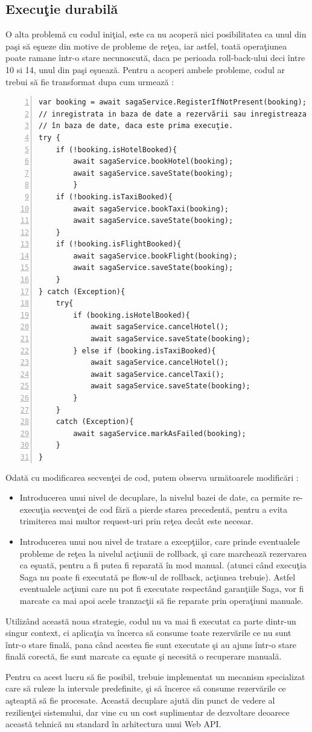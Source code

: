\documentclass[a4paper,12pt]{report}
\begin{document}
\subsection{Execuţie durabilă}
\par O alta problemă cu codul iniţial, este ca nu acoperă nici posibilitatea ca unul din paşi să eşueze din motive de probleme de reţea, iar astfel, toată operaţiunea poate ramane într-o stare necunoscută, daca pe perioada roll-back-ului deci între 10 si 14, unul din paşi eşuează. Pentru a acoperi ambele probleme, codul ar trebui să fie transformat dupa cum urmează : 
\begin{Verbatim}[numbers=left]
var booking = await sagaService.RegisterIfNotPresent(booking); // returneaza starea 
// inregistrata in baza de date a rezervării sau inregistreaza rezervarea 
// în baza de date, daca este prima execuţie.
try {
	if (!booking.isHotelBooked){
		await sagaService.bookHotel(booking);
		await sagaService.saveState(booking);
		}
	if (!booking.isTaxiBooked){
		await sagaService.bookTaxi(booking);
		await sagaService.saveState(booking);
	}
	if (!booking.isFlightBooked){
		await sagaService.bookFlight(booking);
		await sagaService.saveState(booking);
	}
} catch (Exception){
	try{
		if (booking.isHotelBooked){
			await sagaService.cancelHotel();
			await sagaService.saveState(booking);
		} else if (booking.isTaxiBooked){
			await sagaService.cancelHotel();
			await sagaService.cancelTaxi();
			await sagaService.saveState(booking);
		}
	}
	catch (Exception){
		await sagaService.markAsFailed(booking);
	}
}
\end{Verbatim}
Odată cu modificarea secvenţei de cod, putem observa următoarele modificări :
\begin{itemize}
\item Introducerea unui nivel de decuplare, la nivelul bazei de date, ca permite re-execuţia secvenţei de cod fără a pierde starea precedentă, pentru a evita trimiterea mai multor request-uri prin reţea decât este necesar. 
\item Introducerea unui nou nivel de tratare a excepţiilor, care prinde eventualele probleme de reţea la nivelul acţiunii de rollback, şi care marchează rezervarea ca eşuată, pentru a fi putea fi reparată în mod manual. (atunci când execuţia Saga nu poate fi executată pe flow-ul de rollback, acţiunea trebuie). Astfel eventualele acţiuni care nu pot fi executate respectând garanţiile Saga, vor fi marcate ca mai apoi acele tranzacţii să fie reparate prin operaţiuni manuale. 
\end{itemize} 
Utilizând această noua strategie, codul nu va mai fi executat ca parte dintr-un singur context, ci aplicaţia va încerca să consume toate rezervările ce nu sunt într-o stare finală, pana când acestea fie sunt executate şi au ajuns într-o stare finală corectă, fie sunt marcate ca eşuate şi necesită o recuperare manuală.
\par Pentru ca acest lucru să fie posibil, trebuie implementat un mecanism specializat care să ruleze la intervale predefinite, şi să încerce să consume rezervările ce aşteaptă să fie procesate. Această decuplare ajută din punct de vedere al rezilienţei sistemului, dar vine cu un cost suplimentar de dezvoltare deoarece această tehnică nu standard în arhitectura unui Web API.  
\end{document}
